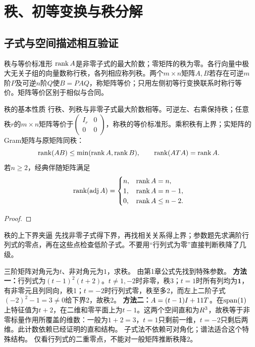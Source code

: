 \section{秩、初等变换与秩分解}
\subsection{子式与空间描述相互验证}
\begin{definition}{秩与等价标准形}
$\operatorname{rank} A$是非零子式的最大阶数；零矩阵的秩为零。各行向量中极大无关子组的向量数称行秩，各列相应称列秩。两个$m\times n$矩阵$A,B$若存在可逆$m$阶$P$及可逆$n$阶$Q$使$B=PAQ$，称矩阵等价；只用左侧初等行变换联系时称行等价。矩阵等价区别于相似与合同。
\end{definition}
\begin{theorem}{秩的基本性质}
行秩、列秩与非零子式最大阶数相等。可逆左、右乘保持秩；任意秩$r$的$m\times n$矩阵等价于$\begin{pmatrix}I_r&0\\0&0\end{pmatrix}$，称秩的等价标准形。乘积秩有上界；实矩阵的Gram矩阵与原矩阵同秩：
\[\operatorname{rank}(AB)\le\min(\operatorname{rank} A,\operatorname{rank} B),\qquad\operatorname{rank}(AT A)=\operatorname{rank} A.\]
若$n\ge2$，经典伴随矩阵满足
\[\operatorname{rank}(\operatorname{adj} A)=\begin{cases}n,&\operatorname{rank} A=n,\\1,&\operatorname{rank} A=n-1,\\0,&\operatorname{rank} A\le n-2.\end{cases}\]
\end{theorem}
\begin{proof}

\end{proof}
\begin{method}{秩的上下界夹逼}
先找非零子式得下界，再找相关关系得上界；参数题先求满阶行列式的零点，再在这些点检查低阶子式。不要用“行列式为零”直接判断秩降了几级。
\end{method}
{三阶矩阵对角元为$t$、非对角元为$1$，求秩。}
{由第1章公式先找到特殊参数。}
{\textbf{方法一：}行列式为$(t-1)^2(t+2)$。$t\ne1,-2$时非零，秩3；$t=1$时所有列均为$\bm1$，有非零元且列同向，秩1；$t=-2$时行列式零，秩至多2，而左上二阶子式$(-2)^2-1=3\ne0$给下界2，故秩2。
\textbf{方法二：}$A=(t-1)I+11T$。在$\operatorname{span}(1)$上特征值为$t+2$，在二维和零平面上为$t-1$。这两个空间直和为$R^3$，故秩等于非零标量作用所覆盖的维数：一般为$1+2=3$，$t=1$只剩前一维，$t=-2$只剩后两维。此计数依赖已经证明的直和结构。}
{子式法不依赖可对角化；谱法适合这个特殊结构。}
{仅看行列式的二重零点，不能对一般矩阵推断秩降$2$。}
